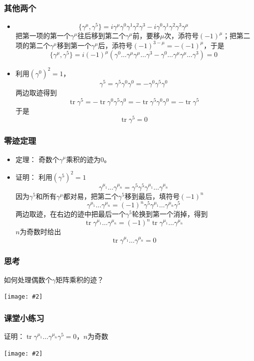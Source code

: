 \documentclass[aspectratio=1610,14pt,matheuler]{beamer}
\newcommand{\bch}{}
\newcommand{\ech}{}
\DeclareMathOperator{\tr}{tr}
\newcommand{\cpic}[2]{
\begin{center}
\texttt{[image: \#2]}
\end{center}
}
\begin{document}
\begin{frame}
\frametitle{\bch 其他两个 \ech}
\bch
\begin{itemize}
\item
$$
\{\gamma^\mu,\gamma^5\} = i\gamma^\mu \gamma^0 \gamma^1 \gamma^2 \gamma^3 - i\gamma^0 \gamma^1 \gamma^2 \gamma^3 \gamma^\mu 
$$
{\small 把第一项的第一个$\gamma^\mu$往后移到第二个$\gamma^\mu$前，要移$\mu$次，添符号$(-1)^\mu$；把第二项的第二个$\gamma^\mu$移到第一个$\gamma^\mu$后，添符号$(-1)^{3-\mu} = -(-1)^\mu$，于是}
$$
\{\gamma^\mu,\gamma^5\} = i(-1)^\mu(\gamma^0 \dots \gamma^\mu \gamma^\mu \dots \gamma^3 - \gamma^0 \dots \gamma^\mu \gamma^\mu \dots \gamma^3) = 0
$$
\item
利用$(\gamma^0)^2 = 1$，$$\gamma^5 = \gamma^5 \gamma^0 \gamma^0 = - \gamma^0 \gamma^5 \gamma^0$$
两边取迹得到
$$
\tr \gamma^5 = - \tr \gamma^0 \gamma^5 \gamma^0 = -\tr \gamma^5 \gamma^0 \gamma^0 = -\tr \gamma^5
$$
于是
$$
\tr \gamma^5 = 0$$
\end{itemize}
\ech
\end{frame}

\begin{frame}
\frametitle{\bch 零迹定理 \ech}
\bch
\begin{itemize}
\item
定理：{\color{blue} 奇数个$\gamma^\mu$乘积的迹为0}。
\item
证明：
利用$(\gamma^5)^2=1$
$$\gamma^{\mu_1} \dots \gamma^{\mu_n} = \gamma^5\gamma^5 \gamma^{\mu_1} \dots \gamma^{\mu_n}$$
因为$\gamma^5$和所有$\gamma^\mu$都对易，把第二个$\gamma^5$移到最后，填符号$(-1)^n$
$$\gamma^{\mu_1} \dots \gamma^{\mu_n} = (-1)^n\gamma^5\gamma^{\mu_1} \dots \gamma^{\mu_n}\gamma^5$$
两边取迹，在右边的迹中把最后一个$\gamma^5$轮换到第一个消掉，得到
$$
\tr \gamma^{\mu_1} \dots \gamma^{\mu_n} = (-1)^n \tr \gamma^{\mu_1} \dots \gamma^{\mu_n}
$$
$n$为奇数时给出
$$
\tr \gamma^{\mu_1} \dots \gamma^{\mu_n}=0
$$
\end{itemize}
\ech
\end{frame}

\begin{frame}
\frametitle{\bch 思考 \ech}
\bch
如何处理偶数个$\gamma$矩阵乘积的迹？
\cpic{0.4}{dina}
\ech
\end{frame}

\begin{frame}
\frametitle{\bch 课堂小练习 \ech}
\bch
证明：$\tr \gamma^{\mu_1} \dots \gamma^{\mu_n} \gamma^5 = 0$，$n$为奇数
\cpic{0.4}{eat}
\ech
\end{frame}
\end{document}

